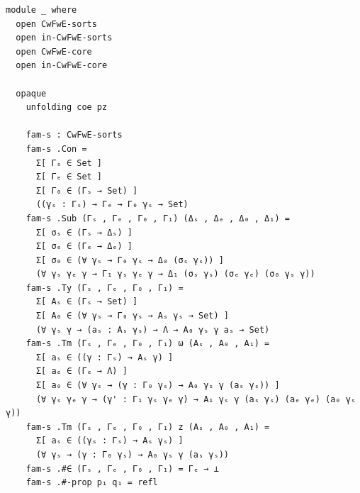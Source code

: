 \documentclass[10pt,a4paper]{article}
\theoremstyle{definition}
\theoremstyle{remark}
\begin{document}
{\begin{Verbatim}[breaklines=true,breakanywhere=true,fontsize=\scriptsize]
module _ where
  open CwFwE-sorts
  open in-CwFwE-sorts
  open CwFwE-core
  open in-CwFwE-core

  opaque
    unfolding coe pz

    fam-s : CwFwE-sorts
    fam-s .Con =
      Σ[ Γₛ ∈ Set ]
      Σ[ Γₑ ∈ Set ]
      Σ[ Γ₀ ∈ (Γₛ → Set) ]
      ((γₛ : Γₛ) → Γₑ → Γ₀ γₛ → Set)
    fam-s .Sub (Γₛ , Γₑ , Γ₀ , Γ₁) (Δₛ , Δₑ , Δ₀ , Δ₁) =
      Σ[ σₛ ∈ (Γₛ → Δₛ) ]
      Σ[ σₑ ∈ (Γₑ → Δₑ) ]
      Σ[ σ₀ ∈ (∀ γₛ → Γ₀ γₛ → Δ₀ (σₛ γₛ)) ]
      (∀ γₛ γₑ γ → Γ₁ γₛ γₑ γ → Δ₁ (σₛ γₛ) (σₑ γₑ) (σ₀ γₛ γ))  
    fam-s .Ty (Γₛ , Γₑ , Γ₀ , Γ₁) =
      Σ[ Aₛ ∈ (Γₛ → Set) ]
      Σ[ A₀ ∈ (∀ γₛ → Γ₀ γₛ → Aₛ γₛ → Set) ]
      (∀ γₛ γ → (aₛ : Aₛ γₛ) → Λ → A₀ γₛ γ aₛ → Set)
    fam-s .Tm (Γₛ , Γₑ , Γ₀ , Γ₁) ω (Aₛ , A₀ , A₁) =
      Σ[ aₛ ∈ ((γ : Γₛ) → Aₛ γ) ]
      Σ[ aₑ ∈ (Γₑ → Λ) ] 
      Σ[ a₀ ∈ (∀ γₛ → (γ : Γ₀ γₛ) → A₀ γₛ γ (aₛ γₛ)) ]
      (∀ γₛ γₑ γ → (γ' : Γ₁ γₛ γₑ γ) → A₁ γₛ γ (aₛ γₛ) (aₑ γₑ) (a₀ γₛ γ)) 
    fam-s .Tm (Γₛ , Γₑ , Γ₀ , Γ₁) z (Aₛ , A₀ , A₁) =
      Σ[ aₛ ∈ ((γₛ : Γₛ) → Aₛ γₛ) ]
      (∀ γₛ → (γ : Γ₀ γₛ) → A₀ γₛ γ (aₛ γₛ))
    fam-s .#∈ (Γₛ , Γₑ , Γ₀ , Γ₁) = Γₑ → ⊥
    fam-s .#-prop p₁ q₁ = refl


\end{Verbatim}}
\end{document}
